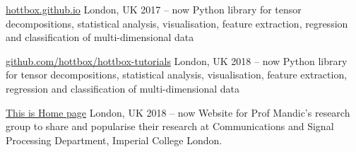 

\begin{cventries}

            {\href{https://hottbox.github.io}{hottbox.github.io}} %
            {London, UK} %
            {2017 -- now} %
            { %
                Python library for tensor decompositions, statistical analysis, visualisation, feature extraction, regression and classification of multi-dimensional data
            }

            {\href{https://github.com/hottbox/hottbox-tutorials}{github.com/hottbox/hottbox-tutorials}} %
            {London, UK} %
            {2018 -- now} %
            { %
                Python library for tensor decompositions, statistical analysis, visualisation, feature extraction, regression and classification of multi-dimensional data
            }

            {\href{http://www.commsp.ee.ic.ac.uk/~csp-mandic/}{This is Home page}} %
            {London, UK} %
            {2018 -- now} %
            { %
                Website for Prof Mandic's research group to share and popularise their research at Communications and Signal Processing Department, Imperial College London.
            }
            
\end{cventries}
